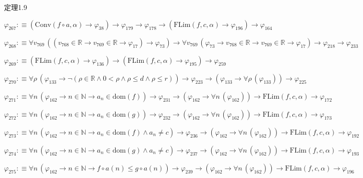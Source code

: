 \begin{fullproof}{定理1.9}
\begin{abbrevlist}
\item $\varphi_{267} :\equiv (\mathrm{Conv}(f \circ a,\alpha) \to \varphi_{38}) \to \varphi_{179} \to \varphi_{178} \to (\mathrm{FLim}(f,c,\alpha) \to \varphi_{196}) \to \varphi_{164}$
\item $\varphi_{268} :\equiv \forall v_{769}\,((v_{768} \in \mathbb{R} \to v_{769} \in \mathbb{R} \to \varphi_{17}) \to \varphi_{73}) \to \forall v_{769}\,(\varphi_{73} \to v_{768} \in \mathbb{R} \to v_{769} \in \mathbb{R} \to \varphi_{17}) \to \varphi_{218} \to \varphi_{233}$
\item $\varphi_{269} :\equiv (\mathrm{FLim}(f,c,\alpha) \to \varphi_{136}) \to (\mathrm{FLim}(f,c,\alpha) \to \varphi_{195}) \to \varphi_{259}$
\item $\varphi_{270} :\equiv \forall \rho\,(\varphi_{133} \to \neg (\rho \in \mathbb{R} \land 0 < \rho \land \rho \leq d \land \rho \leq r)) \to \varphi_{223} \to (\varphi_{133} \to \forall \rho\,(\varphi_{133})) \to \varphi_{225}$
\item $\varphi_{271} :\equiv \forall n\,(\varphi_{162} \to n \in \mathbb{N} \to a_{n} \in \mathrm{dom}(f)) \to \varphi_{231} \to (\varphi_{162} \to \forall n\,(\varphi_{162})) \to \mathrm{FLim}(f,c,\alpha) \to \varphi_{172}$
\item $\varphi_{272} :\equiv \forall n\,(\varphi_{162} \to n \in \mathbb{N} \to a_{n} \in \mathrm{dom}(g)) \to \varphi_{232} \to (\varphi_{162} \to \forall n\,(\varphi_{162})) \to \mathrm{FLim}(f,c,\alpha) \to \varphi_{173}$
\item $\varphi_{273} :\equiv \forall n\,(\varphi_{162} \to n \in \mathbb{N} \to a_{n} \in \mathrm{dom}(f) \land a_{n} \neq c) \to \varphi_{236} \to (\varphi_{162} \to \forall n\,(\varphi_{162})) \to \mathrm{FLim}(f,c,\alpha) \to \varphi_{192}$
\item $\varphi_{274} :\equiv \forall n\,(\varphi_{162} \to n \in \mathbb{N} \to a_{n} \in \mathrm{dom}(g) \land a_{n} \neq c) \to \varphi_{237} \to (\varphi_{162} \to \forall n\,(\varphi_{162})) \to \mathrm{FLim}(f,c,\alpha) \to \varphi_{193}$
\item $\varphi_{275} :\equiv \forall n\,(\varphi_{162} \to n \in \mathbb{N} \to f \circ a(n) \leq g \circ a(n)) \to \varphi_{239} \to (\varphi_{162} \to \forall n\,(\varphi_{162})) \to \mathrm{FLim}(f,c,\alpha) \to \varphi_{196}$
\end{abbrevlist}
\end{fullproof}
